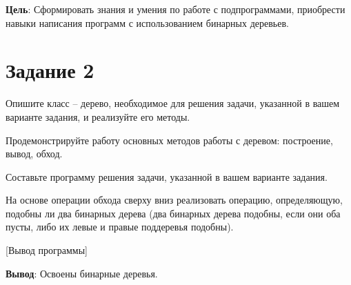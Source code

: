 \documentclass[variant=labwork]{bsuir}
\begin{document}
\maketitle
\mainmatter

\textbf{Цель}: Сформировать знания и умения по работе с подпрограммами,
приобрести навыки написания программ с использованием бинарных деревьев.

\section*{Задание 2}

Опишите класс -- дерево, необходимое для решения задачи, указанной в вашем
варианте задания, и реализуйте его методы.

Продемонстрируйте работу основных методов работы с деревом: построение, вывод,
обход.

Составьте программу решения задачи, указанной в вашем варианте задания.

На основе операции обхода сверху вниз реализовать операцию, определяющую,
подобны ли два бинарных дерева (два бинарных дерева подобны, если они оба пусты,
либо их левые и правые поддеревья подобны).


[Вывод программы]

\textbf{Вывод}: Освоены бинарные деревья.
\end{document}
